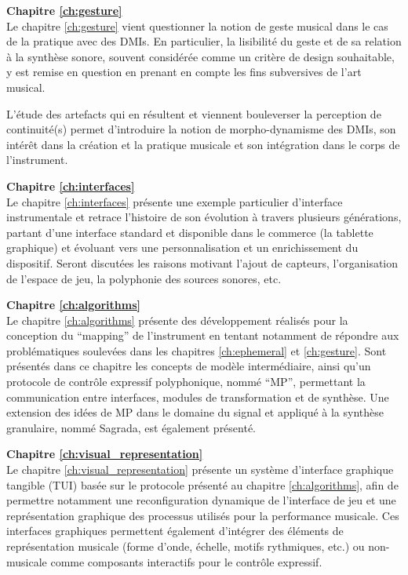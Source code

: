 \textbf{Chapitre \ref{ch:gesture}} \\[0.2em]
Le chapitre \ref{ch:gesture} vient questionner la notion de geste musical dans le cas de la pratique avec des DMIs. En particulier, la lisibilité du geste et de sa relation à la synthèse sonore, souvent considérée comme un critère de design souhaitable, y est remise en question en prenant en compte les fins subversives de l'art musical. 

L'étude des artefacts qui en résultent et viennent bouleverser la perception de continuité(s) permet d'introduire la notion de morpho-dynamisme des DMIs, son intérêt dans la création et la pratique musicale et son intégration dans le corps de l'instrument.

\textbf{Chapitre \ref{ch:interfaces}} \\[0.2em]
Le chapitre \ref{ch:interfaces} présente une exemple particulier d'interface instrumentale et retrace l'histoire de son évolution à travers plusieurs générations, partant d'une interface standard et disponible dans le commerce (la tablette graphique) et évoluant vers une personnalisation et un enrichissement du dispositif. 
Seront discutées les raisons motivant l'ajout de capteurs, l'organisation de l'espace de jeu, la polyphonie des sources sonores, etc.

\textbf{Chapitre \ref{ch:algorithms}} \\[0.2em]
Le chapitre \ref{ch:algorithms} présente des développement réalisés pour la conception du ``mapping'' de l'instrument en tentant notamment de répondre aux problématiques soulevées dans les chapitres \ref{ch:ephemeral} et \ref{ch:gesture}. Sont présentés dans ce chapitre les concepts de modèle intermédiaire, ainsi qu'un protocole de contrôle expressif polyphonique, nommé ``MP'', permettant la communication entre interfaces, modules de transformation et de synthèse. Une extension des idées de MP dans le domaine du signal et appliqué à la synthèse granulaire, nommé Sagrada, est également présenté.

\textbf{Chapitre \ref{ch:visual_representation}} \\[0.2em]
Le chapitre \ref{ch:visual_representation} présente un système d'interface graphique tangible (TUI) basée sur le protocole présenté au chapitre  \ref{ch:algorithms}, afin de permettre notamment une reconfiguration dynamique de l'interface de jeu et une représentation graphique des processus utilisés pour la performance musicale. Ces interfaces graphiques permettent également d'intégrer des éléments de représentation musicale (forme d'onde, échelle, motifs rythmiques, etc.) ou non-musicale comme composants interactifs pour le contrôle expressif.

